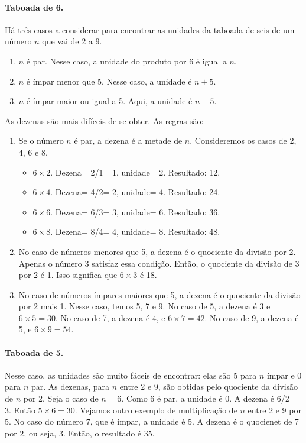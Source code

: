 \documentclass[12pt]{book}
\begin{document}
\paragraph{Taboada de 6.} Há três casos a considerar para
encontrar as unidades da taboada de seis
de um número $n$ que vai de 2 a 9.
\begin{enumerate}
\item $n$ é par. Nesse caso, a unidade do produto por 6 é igual a $n$.
\item $n$ é ímpar menor que 5. Nesse caso, a unidade é $n+5$.
\item $n$ é ímpar maior ou igual a 5. Aqui, a unidade é $n-5$.
\end{enumerate}

As dezenas são mais difíceis de se obter. As regras são:
\begin{enumerate}
\item Se o número $n$ é par, a dezena é a metade de $n$.
Consideremos os casos de 2, 4, 6 e 8. 
\begin{itemize}
\item$6\times 2$. Dezena= 2/1= 1, unidade= 2. Resultado: 12.
\item$6\times 4$. Dezena= 4/2= 2, unidade= 4. Resultado: 24.
\item$6\times 6$. Dezena= 6/3= 3, unidade= 6. Resultado: 36.
\item$6\times 8$. Dezena= 8/4= 4, unidade= 8. Resultado: 48.
\end{itemize}
\item No caso de números menores que 5, a dezena é o quociente
da divisão por 2. Apenas o número 3 satisfaz essa condição.
Então, o quociente da divisão de 3 por 2 é 1. Isso significa
que $6\times 3$ é 18.
\item No caso de números ímpares maiores que 5, a dezena é
o quociente da divisão por 2 mais 1. Nesse caso, temos 5,
7 e 9. No caso de 5, a dezena é 3 e $6\times 5= 30$. 
No caso de 7, a dezena é 4, e $6\times 7= 42$.
No caso de 9, a dezena é 5, e $6\times 9= 54$. 
\end{enumerate}

\paragraph{Taboada de 5.} Nesse caso, as unidades são
muito fáceis de encontrar: elas são 5 para $n$ ímpar
e 0 para $n$ par. As dezenas, para $n$ entre 2 e 9,
são obtidas pelo quociente da divisão de $n$ por 2.
Seja o caso de $n=6$. Como 6 é par, a unidade é 0.
A dezena é 6/2= 3. Então $5\times 6= 30$. 
Vejamos outro exemplo de multiplicação de $n$ entre
2 e 9 por 5. No caso do número 7, que é ímpar, a
unidade é 5. A dezena é o quocienet de 7 por 2,
ou seja, 3. Então, o resultado é 35.
\end{document}
